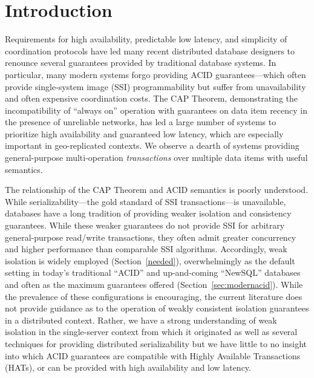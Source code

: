 

\section{Introduction}

Requirements for high availability, predictable low latency, and
simplicity of coordination protocols have led many recent distributed
database designers to renounce several guarantees provided by
traditional database systems. In particular, many modern systems forgo
providing ACID guarantees---which often provide single-system image
(SSI) programmability but suffer from unavailability and often
expensive coordination costs. The CAP Theorem, demonstrating the
incompatibility of ``always on'' operation with guarantees on data
item recency in the presence of unreliable networks, has led a large
number of systems to prioritize high availability and guaranteed low
latency, which are especially important in geo-replicated contexts. We
observe a dearth of systems providing general-purpose multi-operation
\textit{transactions} over multiple data items with useful semantics.

The relationship of the CAP Theorem and ACID semantics is poorly
understood. While serializability---the gold standard of SSI
transactions---is unavailable, databases have a long tradition of
providing weaker isolation and consistency guarantees. While these
weaker guarantees do not provide SSI for arbitrary general-purpose
read/write transactions, they often admit greater concurrency and
higher performance than comparable SSI algorithms. Accordingly, weak
isolation is widely employed (Section~\ref{needed}), overwhelmingly as
the default setting in today's traditional ``ACID'' and up-and-coming
``NewSQL'' databases and often as the maximum guarantees offered
(Section~\ref{sec:modernacid}). While the prevalence of these
configurations is encouraging, the current literature does not provide
guidance as to the operation of weakly consistent isolation guarantees
in a distributed context. Rather, we have a strong understanding of
weak isolation in the single-server context from which it originated
as well as several techniques for providing distributed
serializability but we have little to no insight into which ACID
guarantees are compatible with Highly Available Transactions (HATs),
or can be provided with high availability and low latency.

